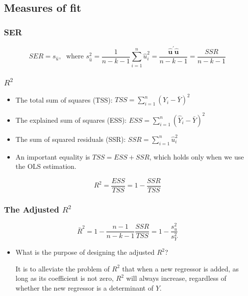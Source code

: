 \documentclass[a4paper,10pt]{article}
\begin{document}
\subsection{Measures of fit}
\label{sec:org4fc6d9c}
\subsubsection*{SER}
\label{sec:org69875e9}
\begin{equation}
\label{eq:ser-m}
SER = s_{\hat{u}},\; \text{ where } s^2_{\hat{u}} = \frac{1}{n-k-1} \sum_{i=1}^n \hat{u}_i^2 =\frac{\mathbf{\hat{u}}^{\prime} \mathbf{\hat{u}}}{n-k-1} = \frac{SSR}{n-k-1}
\end{equation}
\subsubsection*{\(R^2\)}
\label{sec:orgcf26742}
\begin{itemize}
\item The total sum of squares (TSS): \(TSS = \sum_{i=1}^n (Y_i - \bar{Y})^2\)
\item The explained sum of squares (ESS): \(ESS = \sum_{i=1}^n (\hat{Y}_i - \bar{Y})^2\)
\item The sum of squared residuals (SSR): \(SSR = \sum_{i=1}^n
     \hat{u}_i^2\)
\item An important equality is \(TSS = ESS + SSR\), which holds only when we
use the OLS estimation.
\end{itemize}

\begin{equation}
\label{eq:r2-center} 
R^2 = \frac{ESS}{TSS} = 1 - \frac{SSR}{TSS}
\end{equation}

\subsubsection*{The Adjusted \(R^2\)}
\label{sec:orga209b3b}
\begin{equation}
\label{eq:adj-r2}
\bar{R}^2 = 1 - \frac{n-1}{n-k-1}\frac{SSR}{TSS} = 1 - \frac{s^2_u}{s^2_Y}
\end{equation}

\begin{itemize}
\item What is the purpose of designing the adjusted \(R^2\)?

It is to alleviate the problem of \(R^2\) that when a new regressor is
added, as long as its coefficient is not zero, \(R^2\) will always
increase, regardless of whether the new regressor is a determinant
of \(Y\).
\end{itemize}
\end{document}
